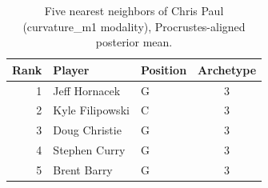 \begin{table}[htbp]
  \centering\small
  \begin{tabular}{rllc}
    \toprule
    Rank & Player & Position & Archetype \\
    \midrule
    1 & Jeff Hornacek & G & 3 \\
    2 & Kyle Filipowski & C & 3 \\
    3 & Doug Christie & G & 3 \\
    4 & Stephen Curry & G & 3 \\
    5 & Brent Barry & G & 3 \\
    \bottomrule
  \end{tabular}
  \caption{Five nearest neighbors of Chris Paul (curvature_m1 modality), Procrustes-aligned posterior mean.}
  \label{tab:Chris_Paul_neighbors_curvature_m1}
\end{table}


